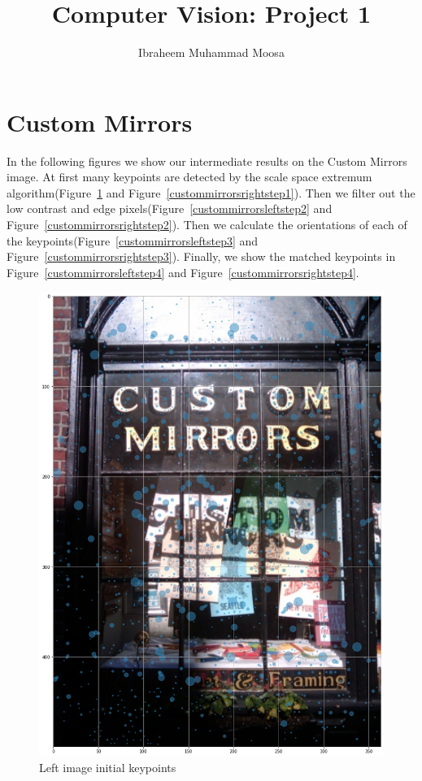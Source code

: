 \documentclass[]{article}
\title{Computer Vision: Project 1}
\author{Ibraheem Muhammad Moosa}
\begin{document}
\maketitle

\section{Custom Mirrors}

In the following figures we show our intermediate results on the Custom Mirrors image. At first many keypoints are detected by the scale space extremum algorithm(Figure~\ref{custommirrorsleftstep1} and Figure~\ref{custommirrorsrightstep1}). Then we filter out the low contrast and edge pixels(Figure~\ref{custommirrorsleftstep2} and Figure~\ref{custommirrorsrightstep2}). Then we calculate the orientations of each of the keypoints(Figure~\ref{custommirrorsleftstep3} and Figure~\ref{custommirrorsrightstep3}). Finally, we show the matched keypoints in Figure~\ref{custommirrorsleftstep4} and Figure~\ref{custommirrorsrightstep4}.
\begin{figure}[htb]
	\centering
	\includegraphics[width=\linewidth]{CustomMirrorsLeftStep1}
	\caption{Left image initial keypoints}
	\label{custommirrorsleftstep1}
\end{figure}
\end{document}
